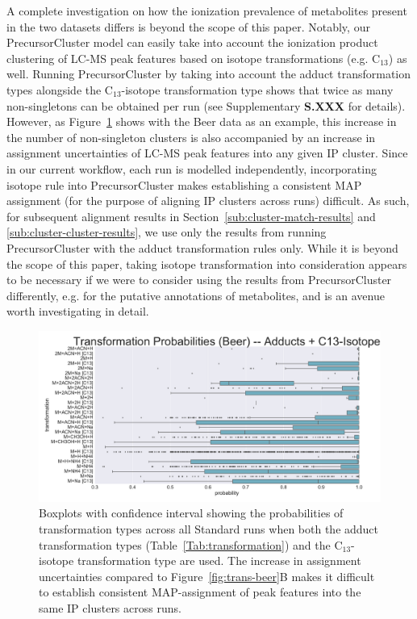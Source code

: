 A complete investigation on how the ionization prevalence of metabolites present in the two datasets differs is beyond the scope of this paper. Notably, our PrecursorCluster model can easily take into account the ionization product clustering of LC-MS peak features based on isotope transformations (e.g. C$_{13}$) as well. Running PrecursorCluster by taking into account the adduct transformation types alongside the C$_{13}$-isotope transformation type shows that twice as many non-singletons can be obtained per run (see Supplementary \textbf{S.XXX} for details). However, as Figure~\ref{fig:more-uncertainty} shows with the Beer data as an example, this increase in the number of non-singleton clusters is also accompanied by an increase in assignment uncertainties of LC-MS peak features into any given IP cluster. Since in our current workflow, each run is modelled independently, incorporating isotope rule into PrecursorCluster makes establishing a consistent MAP assignment (for the purpose of aligning IP clusters across runs) difficult. As such, for subsequent alignment results in Section~\ref{sub:cluster-match-results} and \ref{sub:cluster-cluster-results}, we use only the results from running PrecursorCluster with the adduct transformation rules only. While it is beyond the scope of this paper, taking isotope transformation into consideration appears to be necessary if we were to consider using the results from PrecursorCluster differently, e.g. for the putative annotations of metabolites, and is an avenue worth investigating in detail.

\begin{figure}[!htbp]
\centering
\includegraphics[width=1.0\linewidth]{05-precursor-cluster/figures/prob_trans_Beer_2.pdf}
\caption{\label{fig:more-uncertainty} Boxplots with confidence interval showing the probabilities of transformation types across all Standard runs when both the adduct transformation types (Table~\ref{Tab:transformation}) and the C$_{13}$-isotope transformation type are used. The increase in assignment uncertainties compared to Figure~\ref{fig:trans-beer}B makes it difficult to establish consistent MAP-assignment of peak features into the same IP clusters across runs. }
\end{figure}


